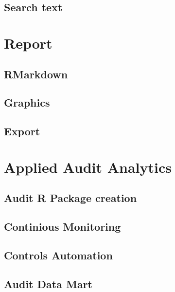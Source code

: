 \documentclass[
]{book}
\begin{document}
\hypertarget{test-searchtext}{%
\section{Search text}\label{test-searchtext}}

\hypertarget{report}{%
\chapter{Report}\label{report}}

\hypertarget{rmarkdown}{%
\section{RMarkdown}\label{rmarkdown}}

\hypertarget{graphics}{%
\section{Graphics}\label{graphics}}

\hypertarget{export}{%
\section{Export}\label{export}}

\hypertarget{applied-audit-analytics}{%
\chapter{Applied Audit Analytics}\label{applied-audit-analytics}}

\hypertarget{auditpackage}{%
\section{Audit R Package creation}\label{auditpackage}}

\hypertarget{continious-monitoring}{%
\section{Continious Monitoring}\label{continious-monitoring}}

\hypertarget{controls-automation}{%
\section{Controls Automation}\label{controls-automation}}

\hypertarget{audit-data-mart}{%
\section{Audit Data Mart}\label{audit-data-mart}}
\end{document}
